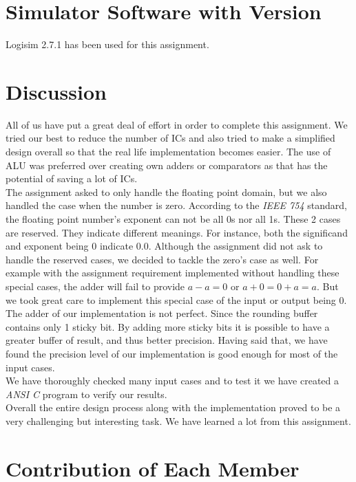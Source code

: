 \documentclass[14pt]{article}
\begin{document}
\section{Simulator Software with Version}
Logisim 2.7.1 has been used for this assignment.

\section{Discussion}
All of us have put a great deal of effort in order to complete this assignment. We tried our best to reduce the number of ICs and also tried to make a simplified design overall so that the real life implementation becomes easier. The use of ALU was preferred over creating own adders or comparators as that has the potential of saving a lot of ICs.\\

The assignment asked to only handle the floating point domain, but we also handled the case when the number is zero. According to the \textit{IEEE 754} standard, the floating point number's exponent can not be all 0s nor all 1s. These 2 cases are reserved. They indicate different meanings. For instance, both the significand and exponent being 0 indicate $0.0$. Although the assignment did not ask to handle the reserved cases, we decided to tackle the zero's case as well. For example with the assignment requirement implemented without handling these special cases, the adder will fail to provide $a - a = 0$ or $a + 0 = 0 + a = a$. But we took great care to implement this special case of the input or output being 0.\\

The adder of our implementation is not perfect. Since the rounding buffer contains only 1 sticky bit. By adding more sticky bits it is possible to have a greater buffer of result, and thus better precision. Having said that, we have found the precision level of our implementation is good enough for most of the input cases.\\

We have thoroughly checked many input cases and to test it we have created a \textit{ANSI C} program to verify our results.\\

Overall the entire design process along with the implementation proved to be a very challenging but interesting task. We have learned a lot from this assignment.

\section{Contribution of Each Member}
\end{document}
